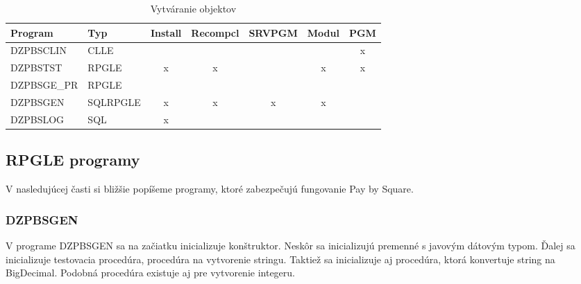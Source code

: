 \begin{table}[ht!]
\caption{Vytváranie objektov}
\label{tab:vytvaranie objektov}
\begin{tabular}{|l|l|c|c|c|c|c|}
\hline
\textbf{Program} & \textbf{Typ} & \multicolumn{1}{l|}{\textbf{Install}} & \multicolumn{1}{l|}{\textbf{Recompcl}} & \multicolumn{1}{l|}{\textbf{SRVPGM}} & \multicolumn{1}{l|}{\textbf{Modul}} & \multicolumn{1}{l|}{\textbf{PGM}} \\ \hline
DZPBSCLIN        & CLLE         &                                       &                                        &                                      &                                     & x                                 \\ \hline
DZPBSTST         & RPGLE        & x                                     & x                                      &                                      & x                                   & x                                 \\ \hline
DZPBSGE\_PR      & RPGLE        &                                       &                                        &                                      &                                     &                                   \\ \hline
DZPBSGEN         & SQLRPGLE     & x                                     & x                                      & x                                    & x                                   &                                   \\ \hline
DZPBSLOG         & \acs{SQL}          & x                                     &                                        &                                      &                                     &                                   \\ \hline
\end{tabular}
\end{table}

\subsection{\acs{RPG}LE programy}
V nasledujúcej časti si bližšie popíšeme programy, ktoré zabezpečujú fungovanie Pay by Square.

\subsubsection{DZPBSGEN}

V programe DZPBSGEN sa na začiatku inicializuje konštruktor. Neskôr sa inicializujú premenné s javovým dátovým typom. Ďalej sa inicializuje testovacia procedúra, procedúra na vytvorenie stringu. Taktiež sa inicializuje aj procedúra, ktorá konvertuje string na BigDecimal. Podobná procedúra existuje aj pre vytvorenie integeru. 

